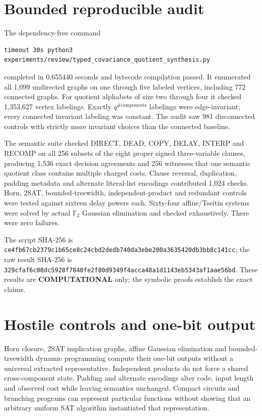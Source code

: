 \documentclass[11pt]{article}
\newcommand{\COMP}{\textbf{COMPUTATIONAL}}
\begin{document}
\section{Bounded reproducible audit}
The dependency-free command
\begin{verbatim}
timeout 30s python3 experiments/review/typed_covariance_quotient_synthesis.py
\end{verbatim}
completed in 0.655440 seconds and bytecode compilation passed.  It enumerated
all 1,099 undirected graphs on one through five labeled vertices, including
772 connected graphs.  For quotient alphabets of size two through four it
checked 1,353,627 vertex labelings.  Exactly
\(q^{\#\text{components}}\) labelings were edge-invariant; every
connected invariant labeling was constant.  The audit saw 981 disconnected
controls with strictly more invariant choices than the connected baseline.

The semantic suite checked DIRECT, DEAD, COPY, DELAY, INTERP and RECOMP on
all 256 subsets of the eight proper signed three-variable clauses, producing
1,536 exact decision agreements and 256 witnesses that one semantic quotient
class contains multiple charged costs.  Clause reversal, duplication,
padding metadata and alternate literal-list encodings contributed 1,024
checks.  Horn, 2SAT, bounded-treewidth, independent-product and redundant
controls were tested against sixteen delay powers each.  Sixty-four
affine/Tseitin systems were solved by actual \(\mathbb F_2\) Gaussian
elimination and checked exhaustively.  There were zero failures.

The script SHA-256 is
\nolinkurl{ce4fb67cb2379c1b65ce8c24cbd2dedb740da3ebe200a3635420db3bb8c141cc}; the raw result SHA-256 is
\nolinkurl{329cfaf6c08dc5928f7840fe2f80d9349f4acca48a1d1143eb5343af1aae56bd}.  These results are \COMP{} only; the
symbolic proofs establish the exact claims.

\section{Hostile controls and one-bit output}
Horn closure, 2SAT implication graphs, affine Gaussian elimination and
bounded-treewidth dynamic programming compute their one-bit outputs without
a universal extracted representative.  Independent products do not force a
shared cross-component state.  Padding and alternate encodings alter code,
input length and observed cost while leaving semantics unchanged.  Compact
circuits and branching programs can represent particular functions without
showing that an arbitrary uniform SAT algorithm instantiated that
representation.
\end{document}
